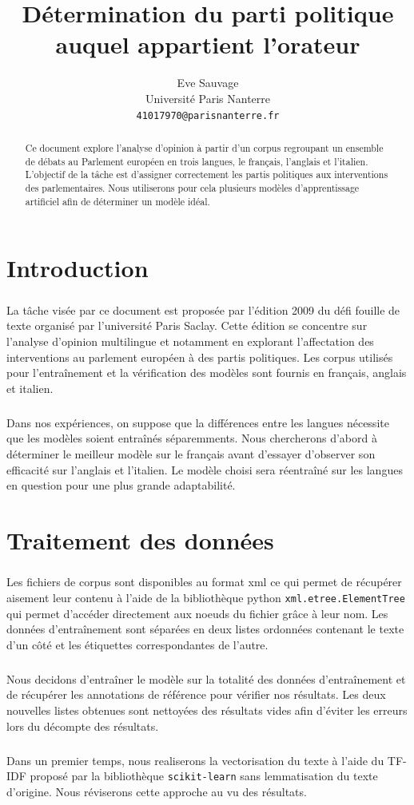 \documentclass[11pt]{article}
\title{Détermination du parti politique auquel appartient l’orateur}
\author{Eve Sauvage \\
  Université Paris Nanterre \\
  \texttt{41017970@parisnanterre.fr}}
\begin{document}
\maketitle
\begin{abstract}
Ce document explore l'analyse d'opinion à partir d'un corpus regroupant un ensemble de débats au Parlement européen en trois langues, le français, l'anglais et l'italien. L'objectif de la tâche est d'assigner correctement les partis politiques aux interventions des parlementaires. Nous utiliserons pour cela plusieurs modèles d'apprentissage artificiel afin de déterminer un modèle idéal.
\end{abstract}

\section{Introduction}

\subparagraph{}
La tâche visée par ce document est proposée par l'édition 2009 du défi fouille de texte organisé par l'université Paris Saclay. Cette édition se concentre sur l'analyse d'opinion multilingue et notamment en explorant l'affectation des interventions au parlement européen à des partis politiques. Les corpus utilisés pour l'entraînement et la vérification des modèles sont fournis en français, anglais et italien.
\subparagraph{}
Dans nos expériences, on suppose que la différences entre les langues nécessite que les modèles soient entraînés séparemments. Nous chercherons d'abord à déterminer le meilleur modèle sur le français avant d'essayer d'observer son efficacité sur l'anglais et l'italien. Le modèle choisi sera réentraîné sur les langues en question pour une plus grande adaptabilité.

\section{Traitement des données}

\subparagraph{}
Les fichiers de corpus sont disponibles au format xml ce qui permet de récupérer aisement leur contenu à l'aide de la bibliothèque python \texttt{xml.etree.ElementTree} qui permet d'accéder directement aux noeuds du fichier grâce à leur nom. Les données d'entraînement sont séparées en deux listes ordonnées contenant le texte d'un côté et les étiquettes correspondantes de l'autre.
\subparagraph{}
Nous decidons d'entraîner le modèle sur la totalité des données d'entraînement et de récupérer les annotations de référence pour vérifier nos résultats. Les deux nouvelles listes obtenues sont nettoyées des résultats vides afin d'éviter les erreurs lors du décompte des résultats.
\subparagraph{}
Dans un premier temps, nous realiserons la vectorisation du texte à l'aide du TF-IDF proposé par la bibliothèque \texttt{scikit-learn} sans lemmatisation du texte d'origine. Nous réviserons cette approche au vu des résultats.
\end{document}
